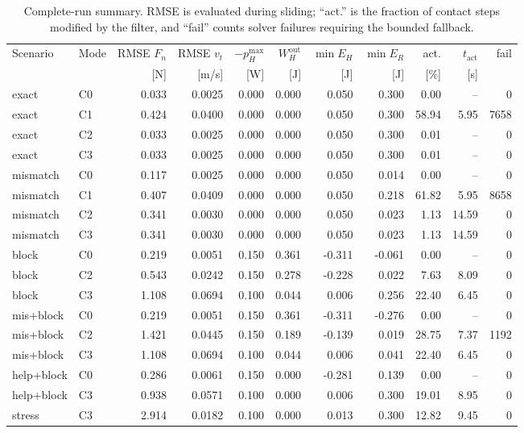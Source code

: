 \begin{table}[t]
\centering
\caption{Complete-run summary. RMSE is evaluated during sliding; ``act.'' is the fraction of contact steps modified by the filter, and ``fail'' counts solver failures requiring the bounded fallback.}
\label{tab:summary}
\small
\setlength{\tabcolsep}{4.5pt}
\begin{tabular}{llrrrrrrrrr}
\toprule
Scenario & Mode & RMSE $F_n$ & RMSE $v_t$ & $-p_H^{\max}$ & $W_H^{\mathrm{out}}$ & $\min E_H$ & $\min E_R$ & act. & $t_{\mathrm{act}}$ & fail \\
 & & [N] & [m/s] & [W] & [J] & [J] & [J] & [\%] & [s] & \\
\midrule
exact & C0 & 0.033 & 0.0025 & 0.000 & 0.000 & 0.050 & 0.300 & 0.00 & -- & 0 \\
exact & C1 & 0.424 & 0.0400 & 0.000 & 0.000 & 0.050 & 0.300 & 58.94 & 5.95 & 7658 \\
exact & C2 & 0.033 & 0.0025 & 0.000 & 0.000 & 0.050 & 0.300 & 0.01 & -- & 0 \\
exact & C3 & 0.033 & 0.0025 & 0.000 & 0.000 & 0.050 & 0.300 & 0.01 & -- & 0 \\
\addlinespace[2pt]
mismatch & C0 & 0.117 & 0.0025 & 0.000 & 0.000 & 0.050 & 0.014 & 0.00 & -- & 0 \\
mismatch & C1 & 0.407 & 0.0409 & 0.000 & 0.000 & 0.050 & 0.218 & 61.82 & 5.95 & 8658 \\
mismatch & C2 & 0.341 & 0.0030 & 0.000 & 0.000 & 0.050 & 0.023 & 1.13 & 14.59 & 0 \\
mismatch & C3 & 0.341 & 0.0030 & 0.000 & 0.000 & 0.050 & 0.023 & 1.13 & 14.59 & 0 \\
\addlinespace[2pt]
block & C0 & 0.219 & 0.0051 & 0.150 & 0.361 & -0.311 & -0.061 & 0.00 & -- & 0 \\
block & C2 & 0.543 & 0.0242 & 0.150 & 0.278 & -0.228 & 0.022 & 7.63 & 8.09 & 0 \\
block & C3 & 1.108 & 0.0694 & 0.100 & 0.044 & 0.006 & 0.256 & 22.40 & 6.45 & 0 \\
\addlinespace[2pt]
mis+block & C0 & 0.219 & 0.0051 & 0.150 & 0.361 & -0.311 & -0.276 & 0.00 & -- & 0 \\
mis+block & C2 & 1.421 & 0.0445 & 0.150 & 0.189 & -0.139 & 0.019 & 28.75 & 7.37 & 1192 \\
mis+block & C3 & 1.108 & 0.0694 & 0.100 & 0.044 & 0.006 & 0.041 & 22.40 & 6.45 & 0 \\
\addlinespace[2pt]
help+block & C0 & 0.286 & 0.0061 & 0.150 & 0.000 & -0.281 & 0.139 & 0.00 & -- & 0 \\
help+block & C3 & 0.938 & 0.0571 & 0.100 & 0.000 & 0.006 & 0.300 & 19.01 & 8.95 & 0 \\
\addlinespace[2pt]
stress & C3 & 2.914 & 0.0182 & 0.100 & 0.000 & 0.013 & 0.300 & 12.82 & 9.45 & 0 \\
\bottomrule
\end{tabular}
\end{table}
